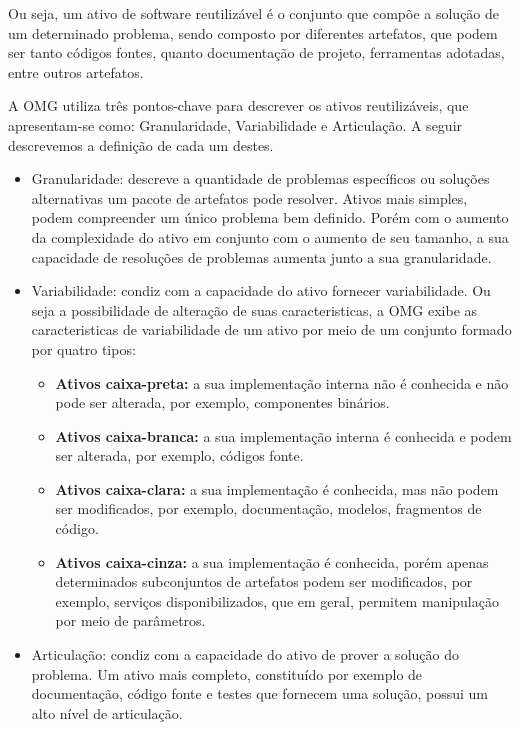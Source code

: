   Ou seja, um ativo de software reutilizável é o conjunto que compõe a solução de um determinado problema, sendo composto por diferentes artefatos, que podem ser tanto códigos fontes, quanto documentação de projeto, ferramentas adotadas, entre outros artefatos.
 

    A OMG  utiliza três pontos-chave para descrever os ativos reutilizáveis, que apresentam-se como: Granularidade, Variabilidade e Articulação. A seguir descrevemos a definição de cada um destes.
    
 \begin{itemize}
    \item Granularidade: descreve a quantidade de problemas específicos ou soluções alternativas um pacote de artefatos pode resolver. Ativos mais simples, podem compreender um único problema bem definido. Porém com o aumento da complexidade do ativo em conjunto com o aumento de seu tamanho, a sua capacidade de resoluções de problemas aumenta junto a sua granularidade.
    \item Variabilidade: condiz com a capacidade do ativo fornecer variabilidade. Ou seja a possibilidade de alteração de suas caracteristicas, a OMG exibe as caracteristicas de variabilidade de um ativo por meio de um conjunto formado por quatro tipos:
    \begin{itemize}
         \item \textbf{Ativos caixa-preta:} a sua implementação interna não é conhecida e não pode ser alterada, por exemplo, componentes binários.
        \item \textbf{Ativos caixa-branca:} a sua implementação interna é conhecida e podem ser alterada, por exemplo, códigos fonte.
        \item \textbf{Ativos caixa-clara:} a sua implementação é conhecida, mas não podem ser modificados, por exemplo, documentação, modelos, fragmentos de código.
        \item \textbf{Ativos caixa-cinza:} a sua implementação é conhecida, porém apenas determinados subconjuntos de artefatos podem ser modificados, por exemplo, serviços disponibilizados, que em geral, permitem manipulação por meio de parâmetros.
    \end{itemize}
    
    \item Articulação: condiz com a capacidade do ativo de prover a solução do problema. Um ativo mais completo, constituído por exemplo de documentação, código fonte e testes que fornecem uma solução, possui um alto nível de articulação. 

\end{itemize}

